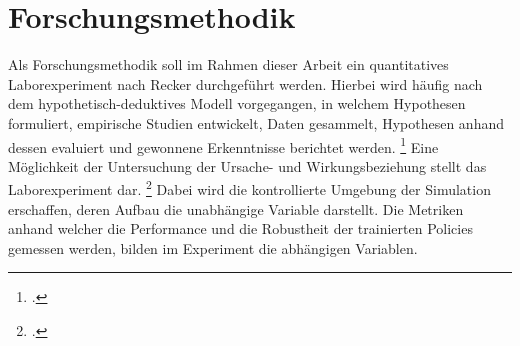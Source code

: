 \section{Forschungsmethodik}

Als Forschungsmethodik soll im Rahmen dieser Arbeit ein quantitatives Laborexperiment nach Recker \cite*[]{Recker.2021} durchgeführt werden.
Hierbei wird häufig nach dem hypothetisch-deduktives Modell vorgegangen, in welchem Hypothesen formuliert, empirische Studien entwickelt, Daten gesammelt, Hypothesen anhand dessen evaluiert und gewonnene Erkenntnisse berichtet werden. \footcite[Vgl.][S. S.89f.]{Recker.2021}
Eine Möglichkeit der Untersuchung der Ursache- und Wirkungsbeziehung stellt das Laborexperiment dar. \footcite[Vgl.][S. 106]{Recker.2021}
Dabei wird die kontrollierte Umgebung der Simulation erschaffen, deren Aufbau die unabhängige Variable darstellt.
Die Metriken anhand welcher die Performance und die Robustheit der trainierten Policies gemessen werden, bilden im Experiment die abhängigen Variablen.

